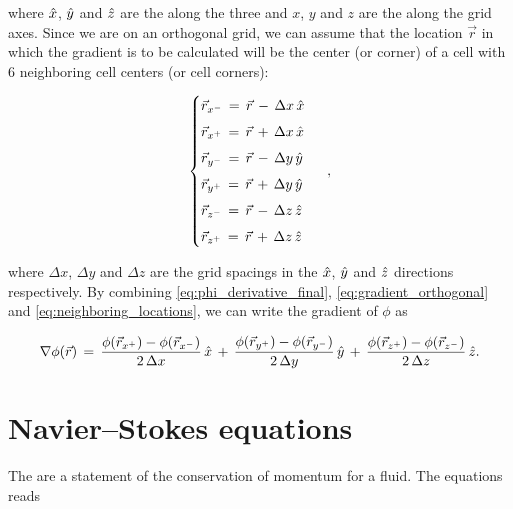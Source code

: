 where $\hat{x}$, $\hat{y}$ and $\hat{z}$ are the \normalized {} along the three \orthogonal {} and $x$, $y$ and $z$ are the  along the grid axes. Since we are on an orthogonal grid, we can assume that the location $\vec{r}$ in which the gradient is to be calculated will be the center (or corner) of a cell with 6 neighboring cell centers (or cell corners):

\begin{equation} \label{eq:neighboring_locations}
\begin{cases}
\vec{r}_{x^-} \,=\, \vec{r} \,-\, \Delta x\,\hat{x}\\[1ex]
\vec{r}_{x^+} \,=\, \vec{r} \,+\, \Delta x\,\hat{x}\\[1ex]
\vec{r}_{y^-} \,=\, \vec{r} \,-\, \Delta y\,\hat{y}\\[1ex]
\vec{r}_{y^+} \,=\, \vec{r} \,+\, \Delta y\,\hat{y}\\[1ex]
\vec{r}_{z^-} \,=\, \vec{r} \,-\, \Delta z\,\hat{z}\\[1ex]
\vec{r}_{z^+} \,=\, \vec{r} \,+\, \Delta z\,\hat{z}
\end{cases}\ ,
\end{equation}

where $\Delta x$, $\Delta y$ and $\Delta z$ are the grid spacings in the $\hat{x}$, $\hat{y}$ and $\hat{z}$ directions respectively. By combining  \ref{eq:phi_derivative_final}, \ref{eq:gradient_orthogonal} and \ref{eq:neighboring_locations}, we can write the gradient of $\phi$ as

\begin{equation} \label{eq:gradient_final}
\nabla\phi(\vec{r}) \,=\,
\frac{\phi(\vec{r}_{x^+})-\phi(\vec{r}_{x^-})}{2\,\Delta x}\,\hat{x} \,+\,
\frac{\phi(\vec{r}_{y^+})-\phi(\vec{r}_{y^-})}{2\,\Delta y}\,\hat{y} \,+\,
\frac{\phi(\vec{r}_{z^+})-\phi(\vec{r}_{z^-})}{2\,\Delta z}\,\hat{z}.
\end{equation}

\section{Navier--Stokes equations}

The  are a statement of the conservation of momentum for a fluid. The  equations reads

